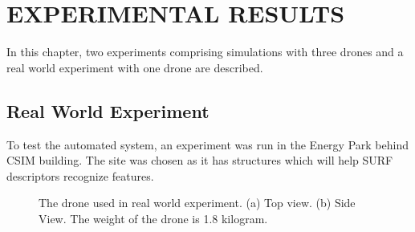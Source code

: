 \setlength{\parindent}{0pt} 
\setlength{\parskip}{0mm}
\setlength{\baselineskip}{1.6em}

\chapter{EXPERIMENTAL RESULTS}
\label{ch:results}
In this chapter, two experiments comprising simulations with three drones and a real world experiment with one drone are described. 

\section{Real World Experiment}
To test the automated system, an experiment was run in the Energy Park behind CSIM building. The site was chosen as it has structures which will help SURF descriptors recognize features. 

\begin{figure} 
	\centering
	\caption[Drone used in experiment.]{\small 
		The drone used in real world experiment. (a) Top view. (b) Side View. The weight of the drone is 1.8 kilogram. }
	\label{fig:real-drone}
\end{figure}


